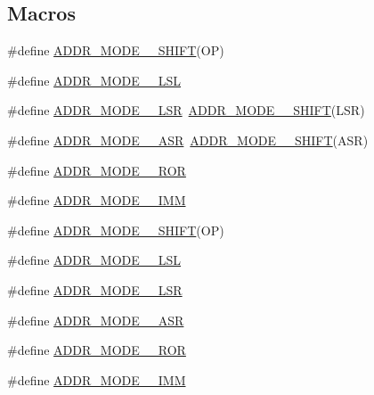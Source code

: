 \subsection*{Macros}
\begin{DoxyCompactItemize}
\item 
\#define \mbox{\hyperlink{decoder-arm_8c_a1aeb19b9eb90e4741cb384f6d6961224}{A\+D\+D\+R\+\_\+\+M\+O\+D\+E\+\_\+\_\+\+S\+H\+I\+FT}}(OP)
\item 
\#define \mbox{\hyperlink{decoder-arm_8c_af7ffdff1f9a8ce3e5f5f534567ce62c7}{A\+D\+D\+R\+\_\+\+M\+O\+D\+E\+\_\+\_\+\+L\+SL}}
\item 
\#define \mbox{\hyperlink{decoder-arm_8c_af7d17794392b03e822fe37dc28142356}{A\+D\+D\+R\+\_\+\+M\+O\+D\+E\+\_\+\_\+\+L\+SR}}~\mbox{\hyperlink{decoder-arm_8c_a1aeb19b9eb90e4741cb384f6d6961224}{A\+D\+D\+R\+\_\+\+M\+O\+D\+E\+\_\+\_\+\+S\+H\+I\+FT}}(L\+SR)
\item 
\#define \mbox{\hyperlink{decoder-arm_8c_a0597e090d6870596c4c41dedeb4c0835}{A\+D\+D\+R\+\_\+\+M\+O\+D\+E\+\_\+\_\+\+A\+SR}}~\mbox{\hyperlink{decoder-arm_8c_a1aeb19b9eb90e4741cb384f6d6961224}{A\+D\+D\+R\+\_\+\+M\+O\+D\+E\+\_\+\_\+\+S\+H\+I\+FT}}(A\+SR)
\item 
\#define \mbox{\hyperlink{decoder-arm_8c_a52afd307d8b50469ab0811de861100c7}{A\+D\+D\+R\+\_\+\+M\+O\+D\+E\+\_\+\_\+\+R\+OR}}
\item 
\#define \mbox{\hyperlink{decoder-arm_8c_a2a4a6ca79222326b9ebf7aa606a84c64}{A\+D\+D\+R\+\_\+\+M\+O\+D\+E\+\_\+\_\+\+I\+MM}}
\item 
\#define \mbox{\hyperlink{decoder-arm_8c_a942a66a3ff232d8a62b8f6714fee9858}{A\+D\+D\+R\+\_\+\+M\+O\+D\+E\+\_\+\_\+\+S\+H\+I\+FT}}(OP)
\item 
\#define \mbox{\hyperlink{decoder-arm_8c_a3eaad6b803c92180598a98e9d706453a}{A\+D\+D\+R\+\_\+\+M\+O\+D\+E\+\_\+\_\+\+L\+SL}}
\item 
\#define \mbox{\hyperlink{decoder-arm_8c_a8d15dc58f1451c9397fe0e2017976826}{A\+D\+D\+R\+\_\+\+M\+O\+D\+E\+\_\+\_\+\+L\+SR}}
\item 
\#define \mbox{\hyperlink{decoder-arm_8c_ada13cb8a55fb5c07e68d39c1e71145e6}{A\+D\+D\+R\+\_\+\+M\+O\+D\+E\+\_\+\_\+\+A\+SR}}
\item 
\#define \mbox{\hyperlink{decoder-arm_8c_aaca37bb8bd19deeb47a5427bef082525}{A\+D\+D\+R\+\_\+\+M\+O\+D\+E\+\_\+\_\+\+R\+OR}}
\item 
\#define \mbox{\hyperlink{decoder-arm_8c_a864abdc617c4084e38b641387039ce1d}{A\+D\+D\+R\+\_\+\+M\+O\+D\+E\+\_\+\_\+\+I\+MM}}

\end{DoxyCompactItemize}
